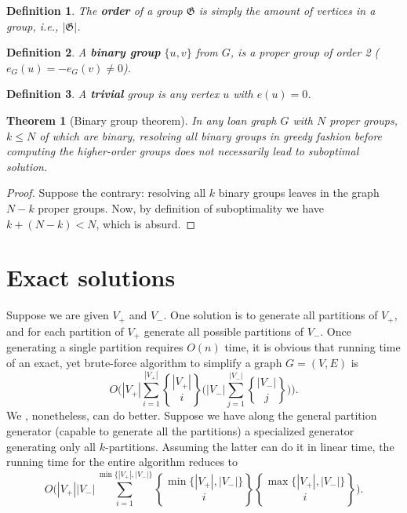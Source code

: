 \documentclass[10pt]{article}
\DeclareRobustCommand{\stirling}{\genfrac\{\}{0pt}{}}
\newtheorem{mydef}{Definition}
\newtheorem{thm}{Theorem}
\begin{document}
\begin{mydef}
The \textbf{order} of a group $\mathfrak{G}$ is simply the amount of vertices in a group, i.e., $|\mathfrak{G}|$. 
\end{mydef}
\begin{mydef}
A \textbf{binary group} $\{ u, v \}$ from $G$, is a proper group of order 2 ($e_G(u) = - e_G(v) \neq 0$).
\end{mydef}
\begin{mydef}
A \textbf{trivial} group is any vertex $u$ with $e(u) = 0$.
\end{mydef}
\begin{thm}[Binary group theorem]
In any loan graph $G$ with $N$ proper groups, $k \leq N$ of which are binary, resolving all binary groups in greedy fashion before computing the higher-order groups does not necessarily lead to suboptimal solution.
\end{thm}
\begin{proof}
Suppose the contrary: resolving all $k$ binary groups leaves in the graph $N - k$ proper groups. Now, by definition of suboptimality we have $k + (N - k) < N$, which is absurd.
\end{proof}
\section{Exact solutions} Suppose we are given $V_+$ and $V_-$. One solution is to generate all partitions of $V_+$, and for each partition of $V_+$ generate all possible partitions of $V_-$. Once generating a single partition requires $O(n)$ time, it is obvious that running time of an exact, yet brute-force algorithm to simplify a graph $G = (V, E)$ is
\[
O\Bigg( |V_+| \sum_{i = 1}^{|V_+|}\stirling{|V_+|}{i} \Bigg( |V_-| \sum_{j = 1}^{|V_-|} \stirling{|V_-|}{j} \Bigg) \Bigg).
\]
We , nonetheless, can do better. Suppose we have along the general partition generator (capable to generate all the partitions) a specialized generator generating only all $k$-partitions. Assuming the latter can do it in linear time, the running time for the entire algorithm reduces to
\[
O\Bigg( |V_+| | V_- | \sum_{i = 1}^{ \min \{ |V_+|, |V_-| \} } \stirling{ \min \{ |V_+|, |V_-|\} }{ i } \stirling{ \max\{ |V_+|, | V_- | \} }{ i } \Bigg).
\]
\end{document}
